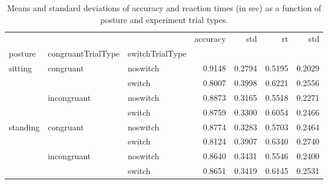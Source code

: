 \begin{table}
\centering
\caption{Means and standard deviations of accuracy and reaction times (in sec) as a function of posture and experiment trial types.}
\label{table-task-switching-replication-reaction-time}
\begin{tabular}{lllrrrr}
\toprule
         &             &        & accuracy &    std &     rt &    std \\
posture & congruantTrialType & switchTrialType &          &        &        &        \\
\midrule
sitting & congruant & noswitch &   0.9148 & 0.2794 & 0.5195 & 0.2029 \\
         &             & switch &   0.8007 & 0.3998 & 0.6221 & 0.2556 \\
         & incongruant & noswitch &   0.8873 & 0.3165 & 0.5518 & 0.2271 \\
         &             & switch &   0.8759 & 0.3300 & 0.6054 & 0.2466 \\
standing & congruant & noswitch &   0.8774 & 0.3283 & 0.5703 & 0.2464 \\
         &             & switch &   0.8124 & 0.3907 & 0.6340 & 0.2740 \\
         & incongruant & noswitch &   0.8640 & 0.3431 & 0.5546 & 0.2400 \\
         &             & switch &   0.8651 & 0.3419 & 0.6145 & 0.2531 \\
\bottomrule
\end{tabular}
\end{table}
